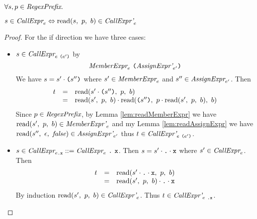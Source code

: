 \documentclass[preprint,10pt]{sigplanconf}
\begin{document}
\begin{lemma}\mbox{}
  
  \( \forall s, p \in \textit{RegexPrefix}. \)
 
  \( s \in \textit{CallExpr}_{e} \Leftrightarrow 
  \textrm{read}(s,~p,~b) \in \textit{CallExpr'}_{e} \)
\end{lemma}
\begin{proof}
  For the if direction we have three cases:
  \begin{itemize}
  \item \( s \in \textit{CallExpr}_{e~\texttt{(}e'\texttt{)}} \) by
    \[
    \textit{MemberExpr}_{e}~\texttt{(}\textit{AssignExpr'}_{e'}\texttt{)}
    \]
    We have \( s = s' \cdot \texttt{(}s''\texttt{)} \) where \( s' \in
    \textit{MemberExpr}_{e} \) and \( s'' \in
    \textit{AssignExpr}_{e'} \). Then
    \[
    \begin{array}{rcl}
      t &=& \textrm{read}(s' \cdot \texttt{(}s''\texttt{)},~p,~b)
      \\
      &=& \textrm{read}(s',~p,~b) \cdot
      \textrm{read}(\texttt{(}s''\texttt{)},~
        p \cdot \textrm{read}(s',~p,~b)
      ,~b)
    \end{array}
    \]
    Since \( p \in \textit{RegexPrefix} \), by Lemma
    \ref{lem:readMemberExpr} we have \( \textrm{read}(s',~p,~b) \in
    \textit{MemberExpr'}_{e} \) and my Lemma
    \ref{lem:readAssignExpr} we have
    \(\textrm{read}(s'',~\epsilon,~\textit{false}) \in
    \textit{AssignExpr'}_{e'} \) thus \( t \in
    \textit{CallExpr'}_{e~\texttt{(}e'\texttt{)}} \).

  \item \( s \in \textit{CallExpr}_{e\texttt{.\texttt{x}}} ::=
    \textit{CallExpr}_{e} ~\texttt{.} ~\texttt{x} \). Then
    \( s = s' \cdot \texttt{.}\cdot \texttt{x} \) where \( s' \in
    \textit{CallExpr}_{e} \). Then
    \[
    \begin{array}{rcl}
      t &=& \textrm{read}(s' \cdot \texttt{.} \cdot \texttt{x},~p,~b)
      \\
      &=& \textrm{read}(s',~p,~b) \cdot \texttt{.}\cdot \texttt{x}
    \end{array}
    \]
    By induction \( \textrm{read}(s',~p,~b) \in \textit{CallExpr'}_{e}
    \). Thus \( t \in \textit{CallExpr'}_{e~\texttt{.\texttt{x}}} \).
  \end{itemize}
\end{proof}
\end{document}
